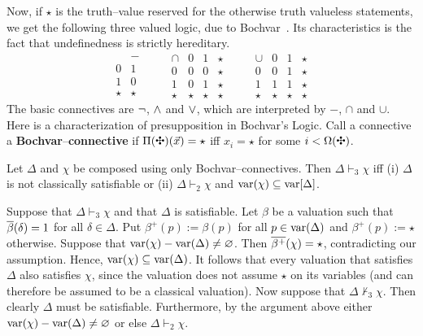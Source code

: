 Now, if $\star$ is the truth--value reserved for the otherwise truth
valueless statements, we get the following three valued logic, 
due to Bochvar~. Its characteristics is the
fact that undefinedness is strictly hereditary.
\begin{equation}
\begin{array}{l|l}
        & - \\\hline
0       & 1 \\
1       & 0 \\
\star   &  \star
\end{array}
\qquad
\begin{array}{l|lll}
\cap    & 0     & 1     & \star \\\hline
0       & 0     & 0     & \star \\
1       & 0     & 1     & \star \\
\star   & \star & \star & \star
\end{array}
\qquad
\begin{array}{l|lll}
\cup    & 0     & 1     & \star \\\hline
0       & 0     & 1     & \star \\
1       & 1     & 1     & \star \\
\star   & \star & \star & \star
\end{array}
\end{equation}
The basic connectives are $\neg$, $\wedge$ and $\vee$, which
are interpreted by $-$, $\cap$ and $\cup$. Here is a characterization
of presupposition in Bochvar's Logic. Call a connective
 a \textbf{Bochvar}--\textbf{connective} if 
$\Pi(\mbox{\ding{67}})(\vec{x}) = \star$ iff $x_i = \star$ 
for some $i < \Omega(\mbox{\ding{67}})$.
\begin{prop}
Let $\Delta$ and $\chi$ be composed using only Boch\-var--con\-nec\-tives.
Then $\Delta \vdash_3 \chi$ iff (i) $\Delta$ is not classically satisfiable 
or (ii) $\Delta \vdash_2 \chi$ and $\operatorname{var}(\chi) \subseteq \operatorname{var}[\Delta]$.
\end{prop}
\proofbeg
Suppose that $\Delta \vdash_3 \chi$ and that
$\Delta$ is satisfiable. Let $\beta$ be a valuation such that
$\overline{\beta}(\delta) = 1$ for all $\delta \in \Delta$. Put
$\beta^+(p) := \beta(p)$ for all $p \in \operatorname{var}(\Delta)$
and $\beta^+(p) := \star$ otherwise. Suppose that
$\operatorname{var}(\chi) - \operatorname{var}(\Delta) \neq \varnothing$.
Then $\overline{\beta^+}(\chi) = \star$, contradicting our assumption.
Hence, $\operatorname{var}(\chi) \subseteq \operatorname{var}(\Delta)$.
It follows that every valuation that satisfies $\Delta$ also
satisfies $\chi$, since the valuation does not assume $\star$
on its variables (and can therefore be assumed to be a classical
valuation). Now suppose that $\Delta \nvdash_3 \chi$.
Then clearly $\Delta$ must be satisfiable. Furthermore, by the
argument above either $\operatorname{var}(\chi) - \operatorname{var}(\Delta)
\neq \varnothing$ or else $\Delta \vdash_2 \chi$.
\proofend

